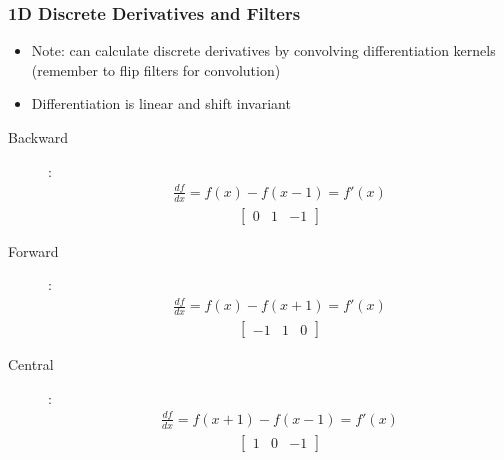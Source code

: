 \documentclass[letterpaper,12pt]{article}
\begin{document}
\subsubsection{1D Discrete Derivatives and Filters}
\begin{itemize}
 \item Note: can calculate discrete derivatives by convolving differentiation kernels (remember to flip filters for convolution)
 \item Differentiation is linear and shift invariant
\end{itemize}
\begin{description}
 \item[Backward]:
       \begin{align}
        \frac{df}{dx} = f(x) - f(x-1) = f'(x)
       \end{align}
       \begin{align}
        \begin{bmatrix}
         0 & 1 & -1
        \end{bmatrix}
       \end{align}
 \item[Forward]:
       \begin{align}
        \frac{df}{dx} = f(x) - f(x+1) = f'(x)
       \end{align}
       \begin{align}
        \begin{bmatrix}
         -1 & 1 & 0
        \end{bmatrix}
       \end{align}
 \item[Central]:
       \begin{align}
        \frac{df}{dx} = f(x+1) - f(x-1) = f'(x)
       \end{align}
       \begin{align}
        \begin{bmatrix}
         1 & 0 & -1
        \end{bmatrix}
       \end{align}
\end{description}
\end{document}
